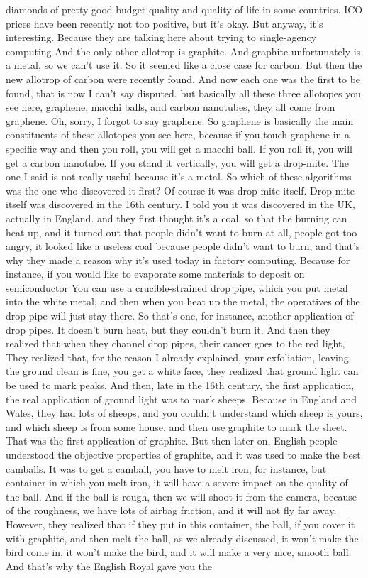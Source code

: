 diamonds of pretty good budget quality and quality of life in some countries. ICO prices have been recently not too positive, but it's okay. But anyway, it's interesting. Because they are talking here about trying to single-agency computing And the only other allotrop is graphite. And graphite unfortunately is a metal, so we can't use it. So it seemed like a close case for carbon.
But then the new allotrop of carbon were recently found. And now each one was the first to be found, that is now I can't say disputed. but basically all these three allotopes you see here, graphene, macchi balls, and carbon nanotubes, they all come from graphene. Oh, sorry, I forgot to say graphene. So graphene is basically the main constituents of these allotopes you see here, because if you touch graphene in a specific way and then you roll, you will get a macchi ball. If you roll it, you will get a carbon nanotube. If you stand it vertically, you will get a drop-mite. The one I said is not really useful because it's a metal. So which of these algorithms was the one who discovered it first? Of course it was drop-mite itself. Drop-mite itself was discovered in the 16th century. I told you it was discovered in the UK, actually in England. and they first thought it's a coal, so that the burning can heat up, and it turned out that people didn't want to burn at all, people got too angry, it looked like a useless coal because people didn't want to burn, and that's why they made a reason why it's used today in factory computing. Because for instance, if you would like to evaporate some materials to deposit on semiconductor You can use a crucible-strained drop pipe, which you put metal into the white metal, and then when you heat up the metal, the operatives of the drop pipe will just stay there. So that's one, for instance, another application of drop pipes. It doesn't burn heat, but they couldn't burn it. And then they realized that when they channel drop pipes, their cancer goes to the red light, They realized that, for the reason I already explained, your exfoliation, leaving the ground clean is fine, you get a white face, they realized that ground light can be used to mark peaks. And then, late in the 16th century, the first application, the real application of ground light was to mark sheeps. Because in England and Wales, they had lots of sheeps, and you couldn't understand which sheep is yours, and which sheep is from some house. and then use graphite to mark the sheet. That was the first application of graphite. But then later on, English people understood the objective properties of graphite, and it was used to make the best camballs. It was to get a camball, you have to melt iron, for instance, but container in which you melt iron, it will have a severe impact on the quality of the ball. And if the ball is rough, then we will shoot it from the camera, because of the roughness, we have lots of airbag friction, and it will not fly far away. However, they realized that if they put in this container, the ball, if you cover it with graphite, and then melt the ball, as we already discussed, it won't make the bird come in, it won't make the bird, and it will make a very nice, smooth ball. And that's why the English Royal gave you the 